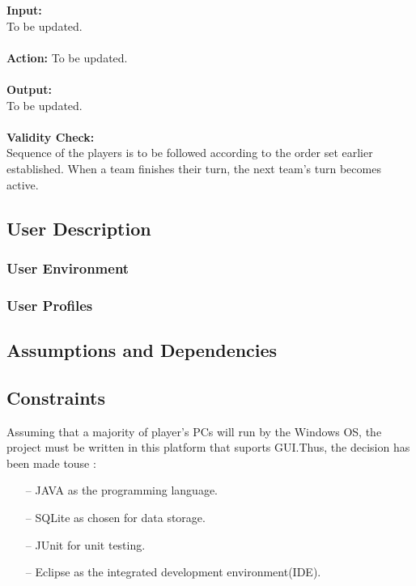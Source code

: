 \documentclass[10pt, a4paper]{article}
\begin{document}
		\textbf{Input:}\\
		To be updated.\\
		\\
		\textbf{Action:}
		To be updated.\\
		\\
		\textbf{Output:}\\
		To be updated.\\
		\\
		\textbf{Validity Check:}\\
		Sequence of the players is to be followed according to the order set earlier established. When a team finishes their turn, the next team's turn becomes active.\\
		
		
	\subsection{User Description}
	
		\subsubsection{User Environment}
		
		\subsubsection{User Profiles}
		
	\subsection{Assumptions and Dependencies}
	
	\subsection{Constraints}
	
	Assuming that a majority of player's PCs will run by the Windows OS, the project must be written in this platform that suports GUI.Thus, the decision has been made touse :
	\begin{itemize}
		\item[--] JAVA as the programming language.
		\item[--] SQLite as chosen for data storage.
		\item[--] JUnit for unit testing.
		\item[--] Eclipse as the integrated development environment(IDE).
	\end{itemize}
		
\end{document}
